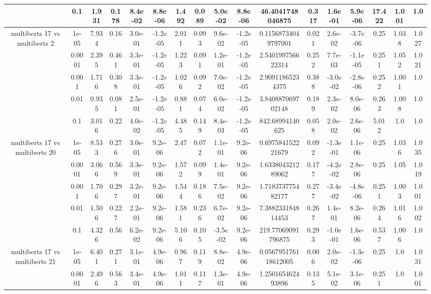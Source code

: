 \begin{tabular}{|c|c|c|c|c|c|c|c|c|c|c|c|c|c|c|c|c|}
 & 0.1 & 1.931 & 0.178 & 8.4e-02 & 8.8e-06 & 1.492 & 0.089 & 5.0e-02 & 8.8e-06 & 46.4041748046875 & 0.317 & 1.6e-01 & 5.9e-06 & 17.422 & 1.001 & 1.0 \\
\hline
\multirow{5}{*}{multiberts 17 vs multiberts 2} & 1e-05 & 7.934 & 0.16 & 3.0e-01 & -1.2e-05 & 2.011 & 0.093 & 9.6e-02 & -1.2e-05 & 0.11568734049797001 & 0.021 & 2.6e-02 & -3.7e-06 & 0.25 & 1.038 & 1.027 \\
 & 0.0001 & 2.395 & 0.461 & 3.3e-01 & -1.2e-05 & 1.223 & 0.091 & 1.2e-01 & -1.2e-05 & 2.540199756622314 & 0.252 & 7.7e-03 & -1.1e-05 & 0.251 & 1.052 & 1.021 \\
 & 0.001 & 1.716 & 0.308 & 3.3e-01 & -1.2e-05 & 1.026 & 0.092 & 7.0e-02 & -1.2e-05 & 2.90911865234375 & 0.388 & -3.0e-02 & -2.8e-06 & 0.252 & 1.001 & 1.0 \\
 & 0.01 & 0.935 & 0.081 & 2.5e-01 & -1.2e-05 & 0.881 & 0.074 & 6.0e-02 & -1.2e-05 & 3.840887069702148 & 0.189 & 2.3e-02 & 8.0e-06 & 0.263 & 1.008 & 1.0 \\
 & 0.1 & 3.016 & 0.22 & 4.0e-02 & -1.2e-05 & 4.485 & 0.149 & 8.4e-03 & -1.2e-05 & 842.68994140625 & 0.058 & 2.0e-02 & 2.6e-06 & 5.012 & 1.0 & 1.0 \\
\hline
\multirow{5}{*}{multiberts 17 vs multiberts 20} & 1e-05 & 8.533 & 0.276 & 3.0e-01 & 9.2e-06 & 2.47 & 0.072 & 1.1e-01 & 9.2e-06 & 0.697584152221679 & 0.092 & -1.3e-01 & 1.1e-06 & 0.25 & 1.036 & 1.035 \\
 & 0.0001 & 3.066 & 0.569 & 3.3e-01 & 9.2e-06 & 1.572 & 0.099 & 1.4e-01 & 9.2e-06 & 1.633804321289062 & 0.177 & -4.2e-02 & 2.8e-06 & 0.25 & 1.05 & 1.019 \\
 & 0.001 & 1.706 & 0.297 & 3.2e-01 & 9.2e-06 & 1.544 & 0.186 & 7.5e-02 & 9.2e-06 & 1.718373775482177 & 0.277 & -3.4e-02 & -4.8e-06 & 0.251 & 1.003 & 1.001 \\
 & 0.01 & 1.506 & 0.227 & 2.2e-01 & 9.2e-06 & 1.581 & 0.236 & 6.7e-02 & 9.2e-06 & 7.388233184814453 & 0.267 & 1.4e-01 & 8.2e-06 & 0.264 & 1.016 & 1.002 \\
 & 0.1 & 4.326 & 0.56 & 6.2e-02 & 9.2e-06 & 5.106 & 0.105 & -3.5e-02 & 9.2e-06 & 219.77069091796875 & 0.293 & -1.0e-01 & 1.6e-06 & 0.537 & 1.006 & 1.0 \\
\hline
\multirow{5}{*}{multiberts 17 vs multiberts 21} & 1e-05 & 6.401 & 0.271 & 3.1e-01 & 4.9e-06 & 0.967 & 0.119 & 8.8e-02 & 4.9e-06 & 0.056795176118612005 & 0.006 & 2.0e-02 & -1.3e-06 & 0.25 & 1.0 & 1.031 \\
 & 0.0001 & 2.496 & 0.563 & 3.4e-01 & 4.9e-06 & 1.011 & 0.117 & 1.3e-01 & 4.9e-06 & 1.250165462493896 & 0.135 & 5.1e-02 & 3.1e-06 & 0.251 & 1.0 & 1.001 \\

\end{tabular}

